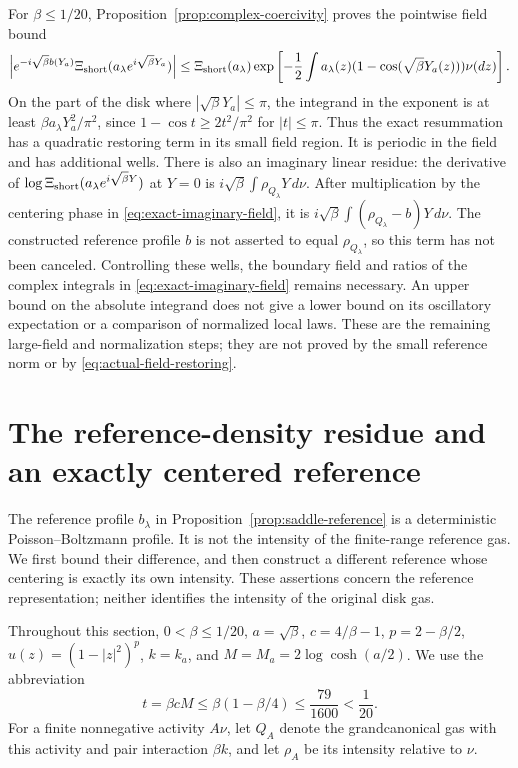 \documentclass[11pt]{article}
\theoremstyle{remark}\newtheorem{remark}[theorem]{Remark}
\begin{document}
For $\beta\le1/20$, Proposition~\ref{prop:complex-coercivity} proves the
pointwise field bound
\begin{equation}\label{eq:actual-field-restoring}
 \left|e^{-i\sqrt\beta b(Y_a)}
       \Xi_{\rm short}(a_\lambda e^{i\sqrt\beta Y_a})\right|
 \le\Xi_{\rm short}(a_\lambda)
       \exp\left[-\frac12\int a_\lambda(z)
             (1-\cos(\sqrt\beta Y_a(z)))\nu(dz)\right].
\end{equation}
On the part of the disk where $|\sqrt\beta Y_a|\le\pi$, the integrand
in the exponent is at least
$\beta a_\lambda Y_a^2/\pi^2$, since
$1-\cos t\ge2t^2/\pi^2$ for $|t|\le\pi$.
Thus the exact resummation has a quadratic restoring term in its small
field region.  It is periodic in the field and has additional wells.
There is also an imaginary linear residue: the derivative of
$\log\Xi_{\rm short}(a_\lambda e^{i\sqrt\beta Y})$
at $Y=0$ is $i\sqrt\beta\int\rho_{Q_\lambda}Y\,d\nu$.
After multiplication by the centering phase in
\eqref{eq:exact-imaginary-field}, it is
$i\sqrt\beta\int(\rho_{Q_\lambda}-b)Y\,d\nu$.
The constructed reference profile $b$ is not asserted to equal
$\rho_{Q_\lambda}$, so this term has not been canceled.
Controlling these wells, the boundary field and ratios of the complex
integrals in \eqref{eq:exact-imaginary-field} remains necessary.  An
upper bound on the absolute integrand does not give a lower bound on
its oscillatory expectation or a comparison of normalized local laws.
These are the remaining large-field and normalization steps; they are
not proved by the small reference norm or by
\eqref{eq:actual-field-restoring}.


\section{The reference-density residue and an exactly centered reference}
\label{sec:reference-residue}

The reference profile $b_\lambda$ in
Proposition~\ref{prop:saddle-reference} is a deterministic Poisson--Boltzmann
profile.  It is not the intensity of the finite-range reference gas.
We first bound their difference, and then construct a different reference
whose centering is exactly its own intensity.  These assertions concern
the reference representation; neither identifies the intensity of the
original disk gas.

Throughout this section, $0<\beta\le1/20$, $a=\sqrt\beta$,
$c=4/\beta-1$, $p=2-\beta/2$, $u(z)=(1-|z|^2)^p$,
$k=k_a$, and $M=M_a=2\log\cosh(a/2)$.  We use the abbreviation
\[
 t=\beta cM\le\beta(1-\beta/4)\le\frac{79}{1600}<\frac1{20}.
\]
For a finite nonnegative activity $A\nu$, let $Q_A$ denote the
grandcanonical gas with this activity and pair interaction $\beta k$,
and let $\rho_A$ be its intensity relative to $\nu$.
\end{document}
